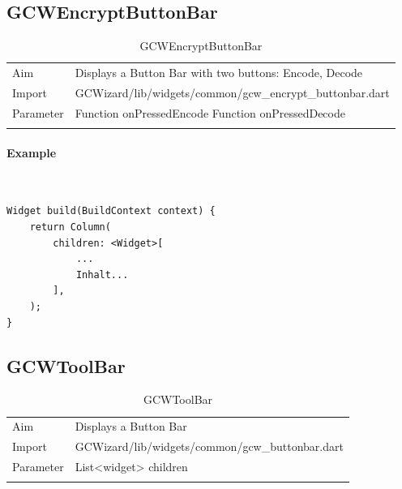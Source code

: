 \newpage
\subsection{GCWEncryptButtonBar}
\label{fig: GCWEncryptButtonBar}
\begin{table}[H]
\begin{tabular}[h]{p{2cm}p{9cm}}
    \caption{GCWEncryptButtonBar}
    Aim       & Displays a Button Bar with two buttons: Encode, Decode\\
    Import    & GCWizard/lib/widgets/common/gcw\_encrypt\_buttonbar.dart\\
    Parameter & Function onPressedEncode\newline
                Function onPressedDecode\\
    \label{tab:GCWEncryptButtonBar}
\end{tabular}
\end{table}
\paragraph*{Example} \,
\begin{lstlisting}
Widget build(BuildContext context) {
    return Column(
        children: <Widget>[
            ...
            Inhalt...
        ],
    );
}
\end{lstlisting}
\label{fig: ExampleGCWEncryptButtonBar}

\newpage
\subsection{GCWToolBar}
\label{fig: GCWToolBar}
\begin{table}[H]
\begin{tabular}[h]{p{2cm}p{9cm}}
    \caption{GCWToolBar}
    Aim       & Displays a Button Bar\\
    Import    & GCWizard/lib/widgets/common/gcw\_buttonbar.dart\\
    Parameter & List<widget> children\\
    \label{tab:GCWToolBar}
\end{tabular}
\end{table}
